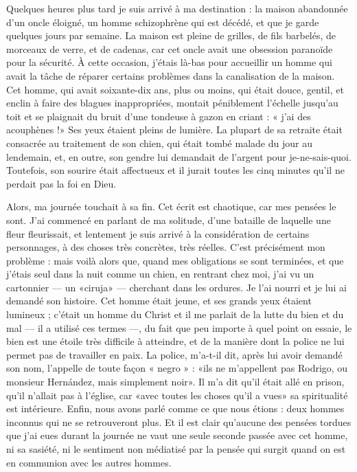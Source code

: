 \documentclass[a4paper, 12pt]{article}
\begin{document}
Quelques heures plus tard je suis arrivé à ma destination : la maison abandonnée
d'un oncle éloigné, un homme schizophrène qui est décédé, et que je garde
quelques jours par semaine. La maison est pleine de grilles, de fils barbelés,
de morceaux de verre, et de cadenas, car cet oncle avait une obsession paranoïde
pour la sécurité. À cette occasion, j'étais là-bas pour accueillir un homme qui
avait la tâche de réparer certains problèmes dans la canalisation de la maison.
Cet homme, qui avait soixante-dix ans, plus ou moins, qui était douce, gentil,
et enclin à faire des blagues inappropriées, montait péniblement l'échelle
jusqu'au toit et se plaignait du bruit d'une tondeuse à gazon en criant : « j'ai
des acouphènes !» Ses yeux étaient pleins de lumière. La plupart de sa retraite
était consacrée au traitement de son chien, qui était tombé malade du jour au
lendemain, et, en outre, son gendre lui demandait de l'argent pour
je-ne-sais-quoi. Toutefois, son sourire était affectueux et il jurait toutes les
cinq minutes qu'il ne perdait pas la foi en Dieu.

Alors, ma journée touchait à sa fin. Cet écrit est chaotique, car mes pensées le
sont. J'ai commencé en parlant de ma solitude, d'une bataille de laquelle une
fleur fleurissait, et lentement je suis arrivé à la considération de certains
personnages, à des choses très concrètes, très réelles. C'est précisément mon
problème : mais voilà alors que, quand mes obligations se sont terminées, et que
j'étais seul dans la nuit comme un chien, en rentrant chez moi, j'ai vu un
cartonnier --- un «ciruja» --- cherchant dans les ordures. Je l'ai nourri et je
lui ai demandé son histoire. Cet homme était jeune, et ses grands yeux étaient
lumineux ; c'était un homme du Christ et il me parlait de la lutte du bien et du
mal --- il a utilisé ces termes ---, du fait que peu importe à quel point on
essaie, le bien est une étoile très difficile à atteindre, et de la manière dont
la police ne lui permet pas de travailler en paix. La police, m'a-t-il dit,
après lui avoir demandé son nom, l'appelle de toute façon « negro » : «ils ne
m'appellent pas Rodrigo, ou monsieur Hernández, mais simplement noir». Il m'a
dit qu'il était allé en prison, qu'il n'allait pas à l'église, car «avec toutes
les choses qu'il a vues» sa spiritualité est intérieure. Enfin, nous avons parlé
comme ce que nous étions : deux hommes inconnus qui ne se retrouveront plus. Et
il est clair qu'aucune des pensées tordues que j'ai eues durant la journée ne
vaut une seule seconde passée avec cet homme, ni sa sasiété, ni le sentiment non
médiatisé par la pensée qui surgit quand on est en communion avec les autres
hommes.
\end{document}
